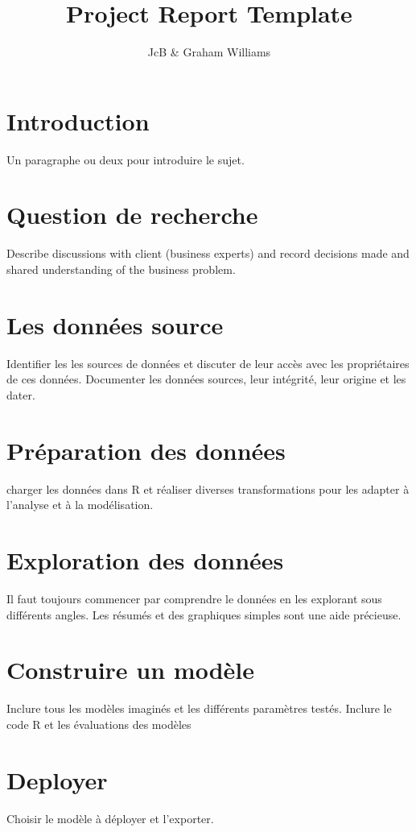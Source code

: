 \documentclass[a4paper]{article}\usepackage[]{graphicx}\usepackage[]{color}
\begin{document}
\title{Project Report Template}
\author{JcB \& Graham Williams}
\maketitle\thispagestyle{empty}

\section{Introduction}
Un paragraphe ou deux pour introduire le sujet.

\section{Question de recherche}
Describe discussions with client (business experts) and record
decisions made and shared understanding of the business problem.

\section{Les données source}
Identifier les les sources de données et discuter de leur accès avec les propriétaires de ces données. Documenter les données sources, leur intégrité, leur origine et les dater.

\section{Préparation des données}

charger les données dans R et réaliser diverses transformations pour les adapter à l'analyse et à la modélisation.

\section{Exploration des données}
Il faut toujours commencer par comprendre le données en les explorant sous différents angles.
Les résumés et des graphiques simples sont une aide précieuse.

\section{Construire un modèle}
Inclure tous les modèles imaginés et les différents paramètres testés.
Inclure le code R et les évaluations des modèles

\section{Deployer}
Choisir le modèle à déployer et l'exporter.
\end{document}
